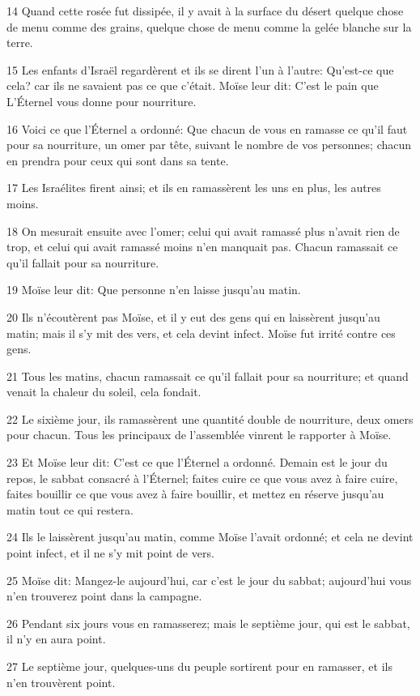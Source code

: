 \par 14 Quand cette rosée fut dissipée, il y avait à la surface du désert quelque chose de menu comme des grains, quelque chose de menu comme la gelée blanche sur la terre.
\par 15 Les enfants d'Israël regardèrent et ils se dirent l'un à l'autre: Qu'est-ce que cela? car ils ne savaient pas ce que c'était. Moïse leur dit: C'est le pain que L'Éternel vous donne pour nourriture.
\par 16 Voici ce que l'Éternel a ordonné: Que chacun de vous en ramasse ce qu'il faut pour sa nourriture, un omer par tête, suivant le nombre de vos personnes; chacun en prendra pour ceux qui sont dans sa tente.
\par 17 Les Israélites firent ainsi; et ils en ramassèrent les uns en plus, les autres moins.
\par 18 On mesurait ensuite avec l'omer; celui qui avait ramassé plus n'avait rien de trop, et celui qui avait ramassé moins n'en manquait pas. Chacun ramassait ce qu'il fallait pour sa nourriture.
\par 19 Moïse leur dit: Que personne n'en laisse jusqu'au matin.
\par 20 Ils n'écoutèrent pas Moïse, et il y eut des gens qui en laissèrent jusqu'au matin; mais il s'y mit des vers, et cela devint infect. Moïse fut irrité contre ces gens.
\par 21 Tous les matins, chacun ramassait ce qu'il fallait pour sa nourriture; et quand venait la chaleur du soleil, cela fondait.
\par 22 Le sixième jour, ils ramassèrent une quantité double de nourriture, deux omers pour chacun. Tous les principaux de l'assemblée vinrent le rapporter à Moïse.
\par 23 Et Moïse leur dit: C'est ce que l'Éternel a ordonné. Demain est le jour du repos, le sabbat consacré à l'Éternel; faites cuire ce que vous avez à faire cuire, faites bouillir ce que vous avez à faire bouillir, et mettez en réserve jusqu'au matin tout ce qui restera.
\par 24 Ils le laissèrent jusqu'au matin, comme Moïse l'avait ordonné; et cela ne devint point infect, et il ne s'y mit point de vers.
\par 25 Moïse dit: Mangez-le aujourd'hui, car c'est le jour du sabbat; aujourd'hui vous n'en trouverez point dans la campagne.
\par 26 Pendant six jours vous en ramasserez; mais le septième jour, qui est le sabbat, il n'y en aura point.
\par 27 Le septième jour, quelques-uns du peuple sortirent pour en ramasser, et ils n'en trouvèrent point.
